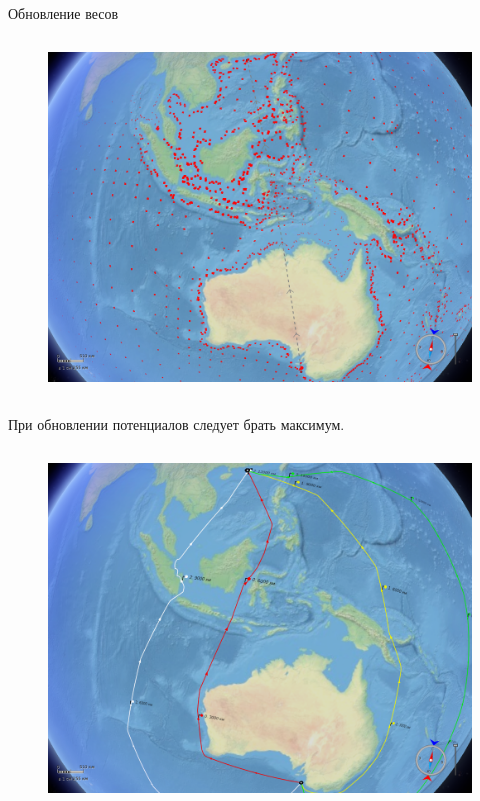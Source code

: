 \documentclass[russian, hyperref={unicode}]{beamer}
\begin{document}
\begin{frame}[noframenumbering]{Обновление весов}
{\begin{columns}
            \begin{figure}
                \includegraphics[clip=true, trim = 280pt 0 20pt 0, width=\textwidth]{Solution/potentials-update/max4}
            \end{figure}
        \end{columns}
        
        \begin{center}
            При обновлении потенциалов следует брать максимум.
        \end{center}
    }
   
     {
        \begin{columns}
            \begin{figure}
                \includegraphics[clip=true, trim = 280pt 0 20pt 0, width=\textwidth]{Solution/potentials-update/accum_result}
            \end{figure}


\end{columns}}
\end{frame}
\end{document}
